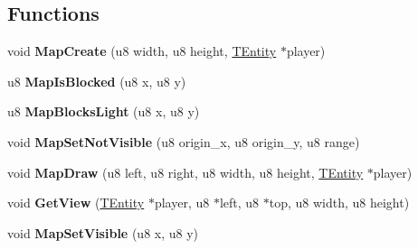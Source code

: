 \subsection*{Functions}
\begin{DoxyCompactItemize}
\item 
\mbox{\label{group__Map_ga0a25d4a00a01f6a01f415c8cf22b17d2}} 
void {\bfseries Map\+Create} (u8 width, u8 height, \mbox{\hyperlink{structTEntity}{T\+Entity}} $\ast$player)
\item 
\mbox{\label{group__Map_ga3eae0d3c0cf7368023838ed2dfc5e3c8}} 
u8 {\bfseries Map\+Is\+Blocked} (u8 x, u8 y)
\item 
\mbox{\label{group__Map_ga4a96cfd7d7f5dab759c0274d498ca927}} 
u8 {\bfseries Map\+Blocks\+Light} (u8 x, u8 y)
\item 
\mbox{\label{group__Map_ga806e9ea5321e82e566b161fcbd5e2e2d}} 
void {\bfseries Map\+Set\+Not\+Visible} (u8 origin\+\_\+x, u8 origin\+\_\+y, u8 range)
\item 
\mbox{\label{group__Map_ga300f688f7b1989dba73d6bae2772a7dc}} 
void {\bfseries Map\+Draw} (u8 left, u8 right, u8 width, u8 height, \mbox{\hyperlink{structTEntity}{T\+Entity}} $\ast$player)
\item 
\mbox{\label{group__Map_gae17467d65d599928e1b7bfa3ddeee49f}} 
void {\bfseries Get\+View} (\mbox{\hyperlink{structTEntity}{T\+Entity}} $\ast$player, u8 $\ast$left, u8 $\ast$top, u8 width, u8 height)
\item 
\mbox{\label{group__Map_gaaf6d5d23473322d54274ad7aa393adcd}} 
void {\bfseries Map\+Set\+Visible} (u8 x, u8 y)
\end{DoxyCompactItemize}
